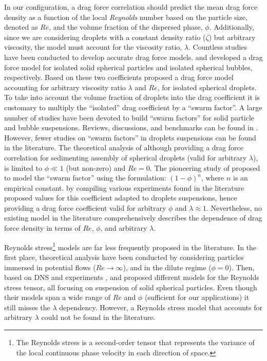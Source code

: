 In our configuration, a drag force correlation should predict the mean drag force density as a function of the local \textit{Reynolds} number based on the particle size, denoted as $Re$, and the volume fraction of the dispersed phase, $\phi$. 
Additionally, since we are considering droplets with a constant density ratio ($\zeta$) but arbitrary viscosity, the model must account for the viscosity ratio, $\lambda$. 
Countless studies have been conducted to develop accurate drag force models. 
\citet{schiller1933} and \citet{mei1994} developed a drag force model for isolated solid spherical particles and isolated spherical bubbles, respectively.
Based on these two coefficients \citet{magnaudet1997forces} proposed a drag force model accounting for arbitrary viscosity ratio $\lambda$ and $Re$, for isolated spherical droplets. 
To take into account the volume fraction of droplets into the drag coefficient it is customary to multiply the ``isolated'' drag coefficient by a ``swarm factor''. 
A large number of studies have been devoted to build ``swarm factors'' for solid particle and bubble suspensions. %
Reviews, discussions, and benchmarks can be found in \citet{simonin2016drag,tenneti2011drag,chen2023review}. 
However, fewer studies on ``swarm factors'' in droplets suspensions can be found in the literature. 
The theoretical analysis of \citet{wacholder1973,haber1981} although providing a drag force correlation for sedimenting assembly of spherical droplets (valid for arbitrary $\lambda$), is limited to $\phi \ll 1$ (but non-zero) and $Re =0$. 
The pioneering study of \citet{richardson1954} proposed to model the ``swarm factor'' using the formulation:  $(1-\phi)^n$, where $n$ is an empirical constant.  
\citet{ishii1979drag} by compiling various experiments found in the literature proposed values for this coefficient adapted to droplets suspensions, hence providing a drag force coefficient valid for arbitrary $\phi$ and $\lambda\approx 1$.
Nevertheless, no existing model in the literature comprehensively describes the dependence of drag force density in terms of $Re$, $\phi$, and arbitrary $\lambda$. 

Reynolds stress\footnote{The Reynolds stress is a second-order tensor that represents the variance of the local continuous phase velocity in each direction of space.}  models are far less frequently proposed in the literature. 
In the first place, theoretical analysis have been conducted by \citet{biesheuvel1984two} considering particles immersed in potential flows ($Re\to\infty$), and in the dilute regime ($\phi=0$). 
Then, based on DNS and experiments \citet{mehrabadi2015pseudo,almeras2021statistics},  and \citet{xia2022improved} proposed different models for the Reynolds stress tensor, all focusing on suspension of solid spherical particles. 
Even though their models span a wide range of $Re$ and $\phi$ (sufficient for our applications) it still misses the $\lambda$ dependency. 
However, a Reynolds stress model that accounts for arbitrary $\lambda$ could not be found in the literature. 

